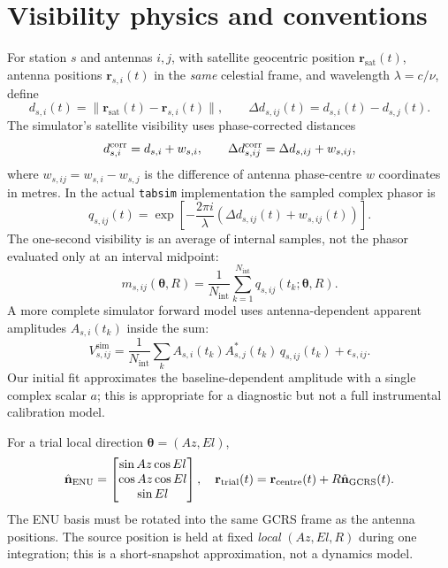 \documentclass[11pt,a4paper]{article}
\begin{document}
\section{Visibility physics and conventions}
For station $s$ and antennas $i,j$, with satellite geocentric position
$\mathbf r_\mathrm{sat}(t)$, antenna positions $\mathbf r_{s,i}(t)$
in the \emph{same} celestial frame, and wavelength $\lambda=c/\nu$, define
\begin{equation}
d_{s,i}(t)=\|\mathbf r_\mathrm{sat}(t)-\mathbf r_{s,i}(t)\|,\qquad
\Delta d_{s,ij}(t)=d_{s,i}(t)-d_{s,j}(t).
\end{equation}
The simulator's satellite visibility uses phase-corrected distances
\begin{equation}
d^{\rm corr}_{s,i}=d_{s,i}+w_{s,i},\qquad
\Delta d^{\rm corr}_{s,ij}=\Delta d_{s,ij}+w_{s,ij},
\end{equation}
where $w_{s,ij}=w_{s,i}-w_{s,j}$ is the difference of
antenna phase-centre $w$ coordinates in metres. In the actual
\texttt{tabsim} implementation the sampled complex phasor is
\begin{equation}
q_{s,ij}(t)=\exp\!\left[-\frac{2\pi i}{\lambda}
\left(\Delta d_{s,ij}(t)+w_{s,ij}(t)\right)\right].
\label{eq:near}
\end{equation}
The one-second visibility is an average of internal samples, not the
phasor evaluated only at an interval midpoint:
\begin{equation}
m_{s,ij}(\boldsymbol\theta,R)=
\frac{1}{N_\mathrm{int}}\sum_{k=1}^{N_\mathrm{int}}
q_{s,ij}(t_k;\boldsymbol\theta,R).
\end{equation}
A more complete simulator forward model uses antenna-dependent apparent
amplitudes $A_{s,i}(t_k)$ inside the sum:
\begin{equation}
V^{\mathrm{sim}}_{s,ij}=
\frac1{N_\mathrm{int}}\sum_k
A_{s,i}(t_k) A_{s,j}^{*}(t_k)\,
q_{s,ij}(t_k)+\epsilon_{s,ij}.
\label{eq:vis}
\end{equation}
Our initial fit approximates the baseline-dependent amplitude with a single
complex scalar $a$; this is appropriate for a diagnostic but not a full
instrumental calibration model.

For a trial local direction $\boldsymbol\theta=(Az,El)$,
\begin{equation}
\hat{\mathbf n}_{\rm ENU}=
\begin{bmatrix}
\sin Az\cos El\\ \cos Az\cos El\\ \sin El
\end{bmatrix},\quad
\mathbf r_{\rm trial}(t)=\mathbf r_{\rm centre}(t)
+R\hat{\mathbf n}_{\rm GCRS}(t).
\label{eq:direction}
\end{equation}
The ENU basis must be rotated into the same GCRS frame as the antenna
positions. The source position is held at fixed \emph{local}
$(Az,El,R)$ during one integration; this is a short-snapshot approximation,
not a dynamics model.
\end{document}
